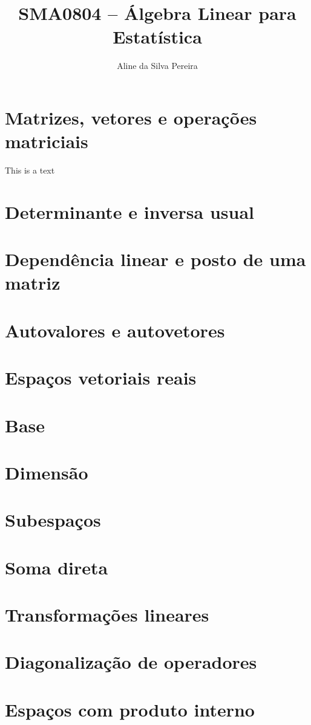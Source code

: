 \documentclass[a4paper,12pt,twoside]{book}
\title{SMA0804 -- Álgebra Linear para Estatística}
\author{Aline da Silva Pereira}
\begin{document}
\frontmatter
\maketitle

\tableofcontents

\mainmatter
\chapter{Matrizes, vetores e operações matriciais}
This is a text
\chapter{Determinante e inversa usual}
\chapter{Dependência linear e posto de uma matriz}
\chapter{Autovalores e autovetores}
\chapter{Espaços vetoriais reais}
\chapter{Base}
\chapter{Dimensão}
\chapter{Subespaços}
\chapter{Soma direta}
\chapter{Transformações lineares}
\chapter{Diagonalização de operadores}
\chapter{Espaços com produto interno}
\end{document}
